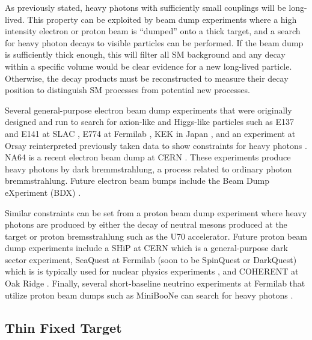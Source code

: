 As previously stated, heavy photons with sufficiently small couplings will be long-lived. This property can be exploited by beam dump experiments where a high intensity electron or proton beam is ``dumped'' onto a thick target, and a search for heavy photon decays to visible particles can be performed. If the beam dump is sufficiently thick enough, this will filter all SM background and any decay within a specific volume would be clear evidence for a new long-lived particle. Otherwise, the decay products must be reconstructed to measure their decay position to distinguish SM processes from potential new processes.

Several general-purpose electron beam dump experiments that were originally designed and run to search for axion-like and Higgs-like particles such as E137 and E141 at SLAC \cite{Bjorken:1988as}, E774 at Fermilab \cite{bross1991}, KEK in Japan \cite{konaka1986}, and an experiment at Orsay reinterpreted previously taken data to show constraints for heavy photons \cite{andreas2012}. NA64 is a recent electron beam dump at CERN \cite{Banerjee_2019}. These experiments produce heavy photons by dark bremmstrahlung, a process related to ordinary photon bremmstrahlung. Future electron beam bumps include the Beam Dump eXperiment (BDX) \cite{battaglieri2016dark}.

Similar constraints can be set from a proton beam dump experiment where heavy photons are produced by either the decay of neutral mesons produced at the target or proton bremsstrahlung such as the U70 accelerator. Future proton beam dump experiments include a SHiP at CERN \cite{Alekhin:2015byh} which is a general-purpose dark sector experiment, SeaQuest at Fermilab (soon to be SpinQuest or DarkQuest) which is is typically used for nuclear physics experiments \cite{Gardner:2015wea}, and COHERENT at Oak Ridge \cite{PhysRevD.92.095005}. Finally, several short-baseline neutrino experiments at Fermilab that utilize proton beam dumps such as MiniBooNe can search for heavy photons \cite{Aguilar_Arevalo_2017} \cite{acciarri2015proposal}.





\subsection{Thin Fixed Target}\label{sec:fixedtarget}

